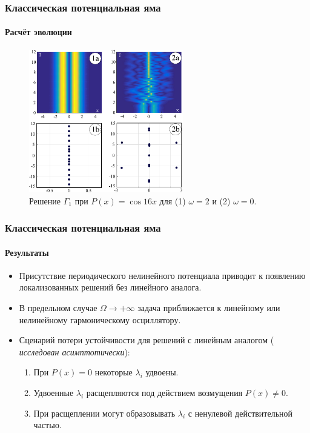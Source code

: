 \documentclass [10pt] {beamer}
\begin{document}
\begin{frame}
	\frametitle{Классическая потенциальная яма}
	\framesubtitle{Расчёт эволюции}
	
	\begin{figure}
		\includegraphics[width=0.6\textwidth]{pic/evolution.pdf}
		\caption{Решение $\Gamma_1$ при $P(x) = \cos 16 x$ для {\color{ceruleanblue} (1)} $\omega = 2$ и {\color{ceruleanblue} (2)} $\omega = 0$.}
		\label{pic:evolution}
	\end{figure}
\end{frame}

\begin{frame}
	\frametitle{Классическая потенциальная яма}
	\framesubtitle{Результаты}
	
	\begin{itemize}
		\item Присутствие периодического нелинейного потенциала приводит к появлению локализованных решений без линейного аналога.
		\item В предельном случае $\Omega \to +\infty$ задача приближается к линейному или нелинейному гармоническому осциллятору.
		\item Сценарий потери устойчивости для решений с линейным аналогом ({\it {\color{ceruleanblue} исследован асимптотически}}):
		\begin{enumerate}
			\item При $P(x) = 0$ некоторые $\lambda_i$ удвоены.
			\item Удвоенные $\lambda_i$ расщепляются под действием возмущения $P(x) \neq 0$.
			\item При расщеплении могут образовывать $\lambda_i$ с ненулевой действительной частью.
		\end{enumerate}
	\end{itemize}
\end{frame}
\end{document}
